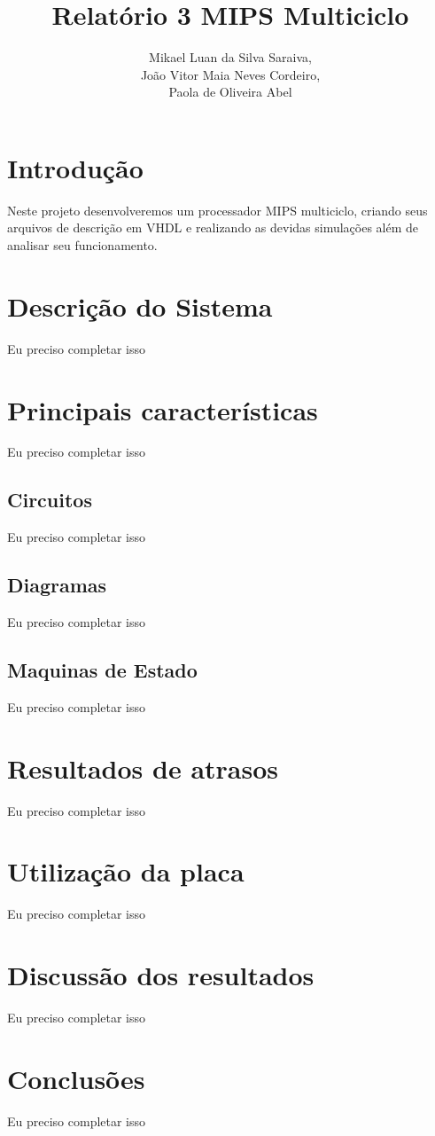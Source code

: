 \documentclass{article}
\title{Relatório 3 \- MIPS Multiciclo}
\author{%
    Mikael Luan da Silva Saraiva, \\
    João Vitor Maia Neves Cordeiro, \\
    Paola de Oliveira Abel
    }
\begin{document}
    \maketitle

    \section{Introdução}

    Neste projeto desenvolveremos um processador MIPS multiciclo, criando seus
    arquivos de descrição em VHDL e realizando as devidas simulações além de
    analisar seu funcionamento.

    \section{Descrição do Sistema}

    Eu preciso completar isso

    \section{Principais características}

    Eu preciso completar isso

    \subsection{Circuitos}

    Eu preciso completar isso

    \subsection{Diagramas}

    Eu preciso completar isso

    \subsection{Maquinas de Estado}

    Eu preciso completar isso

    \section{Resultados de atrasos}

    Eu preciso completar isso

    \section{Utilização da placa}

    Eu preciso completar isso

    \section{Discussão dos resultados}

    Eu preciso completar isso

    \section{Conclusões}

    Eu preciso completar isso
\end{document}
